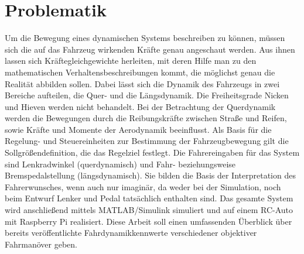 \section{Problematik}
\label{subsec:problematik}
Um die Bewegung eines dynamischen Systems beschreiben zu können, müssen sich die auf das Fahrzeug wirkenden Kräfte genau angeschaut werden. Aus ihnen lassen sich Kräftegleichgewichte herleiten, mit deren Hilfe man zu den mathematischen Verhaltensbeschreibungen kommt, die möglichst genau die Realität abbilden sollen. 
Dabei lässt sich die Dynamik des Fahrzeugs in zwei Bereiche aufteilen, die Quer- und die Längsdynamik.
Die Freiheitsgrade Nicken und Hieven werden nicht behandelt. Bei der Betrachtung der Querdynamik werden die Bewegungen durch die Reibungskräfte zwischen
Straße und Reifen, sowie Kräfte und Momente der Aerodynamik beeinflusst.
Als Basis für die Regelung- und Steuereinheiten zur Bestimmung der Fahrzeugbewegung gilt
die Sollgrößendefinition, die das Regelziel festlegt. Die Fahrereingaben für das System sind Lenkradwinkel (querdynamisch) und Fahr- beziehungsweise Bremspedalstellung (längsdynamisch). Sie bilden die Basis der Interpretation des Fahrerwunsches, wenn auch nur imaginär, da weder bei der Simulation, noch beim Entwurf Lenker und Pedal tatsächlich enthalten sind. Das gesamte System wird anschließend mittels MATLAB/Simulink simuliert und auf einem RC-Auto mit Raspberry Pi realisiert. 
Diese Arbeit soll einen umfassenden Überblick über bereits veröffentlichte Fahrdynamikkennwerte verschiedener objektiver Fahrmanöver geben. 


